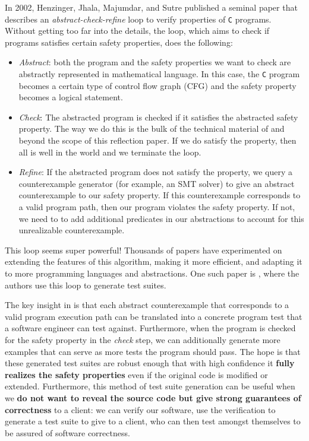 \documentclass[acmsmall,review, nonacm]{acmart}
\begin{document}
In 2002, Henzinger, Jhala, Majumdar, and Sutre published a seminal paper \cite{henzinger2002lazy} that describes an \textit{abstract-check-refine} loop to verify properties of \texttt{C} programs. Without getting too far into the details, the loop, which aims to check if programs satisfies certain safety properties, does the following:
\begin{itemize}
  \item \textit{Abstract}: both the program and the safety properties we want to check are abstractly represented in mathematical language. In this case, the \texttt{C} program becomes a certain type of control flow graph (CFG) and the safety property becomes a logical statement.
  \item \textit{Check}: The abstracted program is checked if it satisfies the abstracted safety property. The way we do this is the bulk of the technical material of \cite{henzinger2002lazy} and beyond the scope of this reflection paper. If we do satisfy the property, then all is well in the world and we terminate the loop.
  \item \textit{Refine}: If the abstracted program does not satisfy the property, we query a counterexample generator (for example, an SMT solver) to give an abstract counterexample to our safety property. If this counterexample corresponds to a valid program path, then our program violates the safety property. If not, we need to to add additional predicates in our abstractions to account for this unrealizable counterexample. 
\end{itemize}

This loop seems super powerful! Thousands of papers have experimented on extending the features of this algorithm, making it more efficient, and adapting it to more programming languages and abstractions. One such paper is \cite{beyer2004generating}, where the authors use this loop to generate test suites. 

The key insight in \cite{beyer2004generating} is that each abstract counterexample that corresponds to a valid program execution path can be translated into a concrete program test that a software engineer can test against. Furthermore, when the program is checked for the safety property in the \textit{check} step, we can additionally generate more examples that can serve as more tests the program should pass. The hope is that these generated test suites are robust enough that with high confidence it \textbf{fully realizes the safety properties} even if the original code is modified or extended. Furthermore, this method of test suite generation can be useful when we \textbf{do not want to reveal the source code but give strong guarantees of correctness} to a client: we can verify our software, use the verification to generate a test suite to give to a client, who can then test amongst themselves to be assured of software correctness. 
\end{document}
